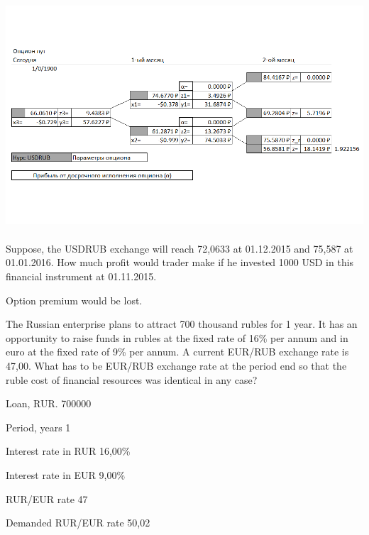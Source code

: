 \documentclass[12pt, table]{exam}
\begin{document}
\begin{questions}
\begin{subparts}
\begin{solution}[20em]
			\includegraphics[height=8.5cm]{img/option_put_usdrub.png}
		\end{solution}
		
		\subpart[5] Suppose, the USDRUB exchange will reach 72,0633 at 01.12.2015 and 75,587 at 01.01.2016. How much profit would trader make if he invested 1000 USD in this financial instrument at 01.11.2015.
		\begin{solution}[8em]
			
			Option premium would be lost.
			
		\end{solution}
		
	\end{subparts}
	\addpoints
	
	\pagebreak
	\question[10] The Russian enterprise plans to attract 700 thousand rubles for 1 year. It has an opportunity to raise funds in rubles at the fixed rate of 16\% per annum and in euro at the fixed rate of 9\% per annum. A current EUR/RUB exchange rate is 47,00. What has to be EUR/RUB exchange rate at the period end so that the ruble cost of financial resources was identical in any case?
	
	\begin{solution}[8em]
		
		Loan, RUR.	700000
		
		Period, years	1
		
		Interest rate in RUR	16,00\%
		
		Interest rate in EUR	9,00\%
		
		RUR/EUR rate	47
		
		Demanded RUR/EUR rate	50,02
				
	\end{solution}
	

\end{questions}
\end{document}
